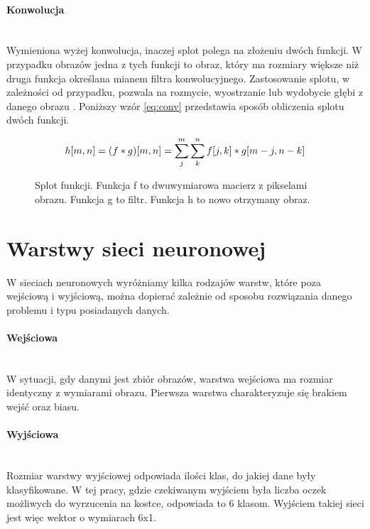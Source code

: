 \paragraph{Konwolucja} \mbox{}\\
Wymieniona wyżej konwolucja, inaczej splot polega na złożeniu dwóch funkcji. W przypadku obrazów
jedna z tych funkcji to obraz, który ma rozmiary większe niż druga funkcja określana
mianem filtra konwolucyjnego. Zastosowanie splotu, w zależności od przypadku,
pozwala na rozmycie, wyostrzanie lub wydobycie głębi z danego obrazu \cite{konwolucja}.
Poniższy wzór \ref{eq:conv} przedstawia sposób obliczenia splotu dwóch funkcji.
\begin{figure}[h!]
\renewcommand{\figurename}{Wzór}%
\begin{equation} \label{eq:conv}
h[m, n] = (f * g)[m, n] = \sum_j^m \sum_k^n f[j, k] * g[m-j, n-k] \\
\end{equation}
\centering
\captionsetup{justification=centering,margin=1cm}
\caption{Splot funkcji. Funkcja f to dwuwymiarowa macierz z pikselami obrazu. Funkcja g to filtr. Funkcja h to nowo otrzymany obraz.}
\end{figure}

\section{Warstwy sieci neuronowej}

W sieciach neuronowych wyróżniamy kilka rodzajów warstw, które poza wejściową i wyjściową,
można dopierać zależnie od sposobu rozwiązania danego problemu i typu posiadanych danych.

\paragraph{Wejściowa} \mbox{}\\
W sytuacji, gdy danymi jest zbiór obrazów, warstwa wejściowa ma rozmiar identyczny z
wymiarami obrazu. Pierwsza warstwa charakteryzuje się brakiem wejść oraz biasu.

\paragraph{Wyjściowa} \mbox{}\\
Rozmiar warstwy wyjściowej odpowiada ilości klas, do jakiej dane były klasyfikowane.
W tej pracy, gdzie czekiwanym wyjściem była liczba oczek możliwych do wyrzucenia na
kostce, odpowiada to 6 klasom. Wyjściem takiej sieci jest więc wektor o wymiarach 6x1.

